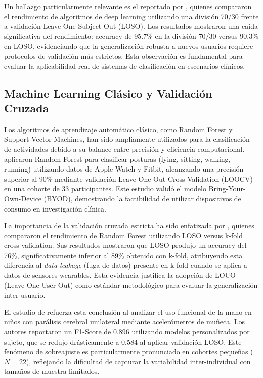 Un hallazgo particularmente relevante es el reportado por \cite{Bassani2025DLHAR}, quienes compararon el rendimiento de algoritmos de deep learning utilizando una división 70/30 frente a validación Leave-One-Subject-Out (LOSO). Los resultados mostraron una caída significativa del rendimiento: accuracy de 95.7\% en la división 70/30 versus 90.3\% en LOSO, evidenciando que la generalización robusta a nuevos usuarios requiere protocolos de validación más estrictos. Esta observación es fundamental para evaluar la aplicabilidad real de sistemas de clasificación en escenarios clínicos.


\subsection{Machine Learning Clásico y Validación Cruzada}
\label{subsec:ml_clasico}

Los algoritmos de aprendizaje automático clásico, como Random Forest y Support Vector Machines, han sido ampliamente utilizados para la clasificación de actividades debido a su balance entre precisión y eficiencia computacional. \cite{Fuller2021Predicting} aplicaron Random Forest para clasificar posturas (lying, sitting, walking, running) utilizando datos de Apple Watch y Fitbit, alcanzando una precisión superior al 90\% mediante validación Leave-One-Out Cross-Validation (LOOCV) en una cohorte de 33 participantes. Este estudio validó el modelo Bring-Your-Own-Device (BYOD), demostrando la factibilidad de utilizar dispositivos de consumo en investigación clínica.

La importancia de la validación cruzada estricta ha sido enfatizada por \cite{Rehman2024LOSO}, quienes compararon el rendimiento de Random Forest utilizando LOSO versus k-fold cross-validation. Sus resultados mostraron que LOSO produjo un accuracy del 76\%, significativamente inferior al 89\% obtenido con k-fold, atribuyendo esta diferencia al \textit{data leakage} (fuga de datos) presente en k-fold cuando se aplica a datos de sensores wearables. Esta evidencia justifica la adopción de LOUO (Leave-One-User-Out) como estándar metodológico para evaluar la generalización inter-usuario.

El estudio de \cite{Mathew2024LOSO} refuerza esta conclusión al analizar el uso funcional de la mano en niños con parálisis cerebral unilateral mediante acelerómetros de muñeca. Los autores reportaron un F1-Score de 0.896 utilizando modelos personalizados por sujeto, que se redujo drásticamente a 0.584 al aplicar validación LOSO. Este fenómeno de sobreajuste es particularmente pronunciado en cohortes pequeñas ($N=22$), reflejando la dificultad de capturar la variabilidad inter-individual con tamaños de muestra limitados.

